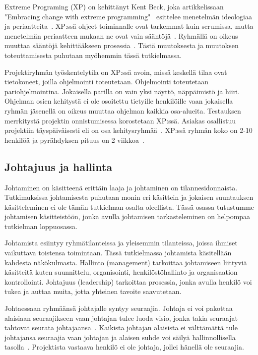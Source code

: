 \documentclass[finnish]{tktltiki2}
\theoremstyle{definition}
\theoremstyle{remark}
\begin{document}
Extreme Programing (XP) on kehittänyt Kent Beck, joka artikkelissaan "Embracing change with extreme programming"  \ esittelee menetelmän ideologiaa ja periaatteita~\cite{796139}. XP:ssä ohjeet toiminnalle ovat tarkemmat kuin scrumissa, mutta menetelmän periaatteen mukaan ne ovat vain sääntöjä~\cite{cohen2004introduction}. Ryhmällä on oikeus muuttaa sääntöjä kehittääkseen prosessia~\cite{cohen2004introduction}. Tästä muutoksesta ja muutoksen toteuttamisesta puhutaan myöhemmin tässä tutkielmassa.

Projektiryhmän työskentelytila on XP:ssä avoin, missä keskellä tilaa ovat tietokoneet, joilla ohjelmointi toteutetaan. Ohjelmointi toteutetaan pariohjelmointina. Jokaisella parilla on vain yksi näyttö, näppäimistö ja hiiri. Ohjelman osien kehitystä ei ole osoitettu tietyille henkilöille vaan jokaisella ryhmän jäsenellä on oikeus muuttaa ohjelman kaikkia osa-alueita. Testauksen merrkitystä projektin onnistumisessa korostetaan XP:ssä. Asiakas osallistuu projektiin täyspäiväisesti eli on osa kehitysryhmää~\cite{796139}. XP:ssä ryhmän koko on 2-10 henkilöä ja pyrähdyksen pituus on 2 viikkoa~\cite{cohen2004introduction}. 


\subsection{Johtajuus ja hallinta}

Johtaminen on käsitteenä erittäin laaja ja johtaminen on tilannesidonnaista. Tutkimuksissa johtamisesta puhutaan monin eri käsittein ja jokaisen suuntauksen käsitteleminen ei ole tämän tutkielman osalta oleellista. Tässä osassa tutustumme johtamisen käsitteistöön, jonka avulla johtamisen tarkasteleminen on helpompaa tutkielman loppuosassa.

Johtamista esiintyy ryhmätilanteissa ja yleisemmin tilanteissa, joissa ihmiset vaikuttava toistensa toimintaan. Tässä tutkielmassa johtamista käsitellään kahdesta näkökulmasta. Hallinto (management) tarkoittaa johtamiseen liittyviä käsitteitä kuten suunnittelu, organisointi, henkilöstöhallinto ja organisaation kontrollointi. Johtajuus (leadership) tarkoittaa prosessia, jonka avulla henkilö voi tukea ja auttaa muita, jotta yhteinen tavoite saavutetaan.

Johtaessaan ryhmäänsä johtajalle syntyy seuraajia. Johtaja ei voi pakottaa alaisiaan seuraajikseen vaan johtajan tulee luoda visio, jonka takia seuraajat tahtovat seurata johtajaansa~\cite{raccoon2006leadership}. Kaikista johtajan alaisista ei välttämättä tule johtajansa seuraajia vaan johtajan ja alaisen suhde voi säilyä hallinnollisella tasolla~\cite{raccoon2006leadership}. Projektista vastaava henkilö ei ole johtaja, jollei hänellä ole seuraajia.
\end{document}
